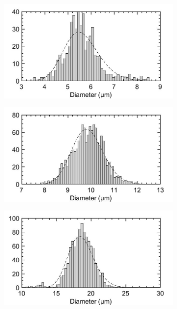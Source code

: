 \begin{figure}[ht]
\centering
\begin{subfigure}{.5\textwidth}
  \centering
  \includegraphics[width=1\linewidth]{figures/Images/Measurement1_5um}
  \label{fig:Meas1_5um}
\end{subfigure}
\begin{subfigure}{.49\textwidth}
  \centering
  \includegraphics[width=1\linewidth]{figures/Images/Measurement1_10um}
  \label{fig:Meas1_10um}
\end{subfigure}
\begin{subfigure}{.5\textwidth}
  \centering
  \includegraphics[width=1\linewidth]{figures/Images/Measurement1_20um}

\end{subfigure}
\end{figure}
